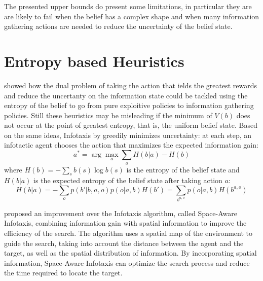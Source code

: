 The presented upper bounds do present some limitations, in particular they are are likely to
fail when the belief has a complex shape and when many information 
gathering actions are needed to reduce the uncertainty of the belief state.

\section{Entropy based Heuristics}
\cite{10.5555/926710} showed how the dual problem of taking the action that ields the 
greatest rewards and reduce the uncertanty on the information state could be tackled 
using the entropy of the belief to go from 
pure exploitive policies to information gathering policies.
Still these heuristics may be misleading if the minimum of $V(b)$ does not occur at 
the point of greatest entropy, that is, the uniform belief state.
Based on the same ideas, Infotaxis by \cite{PMID:17251974} greedily minimizes 
uncertainty: at each step, an infotactic agent chooses the 
action that maximizes the expected information gain:
$$a^* = \arg\max_a \sum_o H(b|a) - H(b)$$
where $H(b) = -\sum_s b(s) \log b(s)$ is the entropy of the belief state and 
$H(b|a)$ is the expected entropy of the belief state after taking action $a$:
$$H(b|a) = -\sum_o p(b'|b,a,o)p(o|a,b)H(b') = \sum_{b^{a,o}}p(o|a,b)H(b^{a,o})$$

\cite{e26040302} proposed an improvement over the Infotaxis algorithm, called Space-Aware Infotaxis, 
combining information gain with spatial information to improve the efficiency of the search.
The algorithm uses a spatial map of the environment to guide the search, taking into account the
distance between the agent and the target, as well as the spatial distribution of information.
By incorporating spatial information, Space-Aware Infotaxis can optimize the search process
and reduce the time required to locate the target. 






